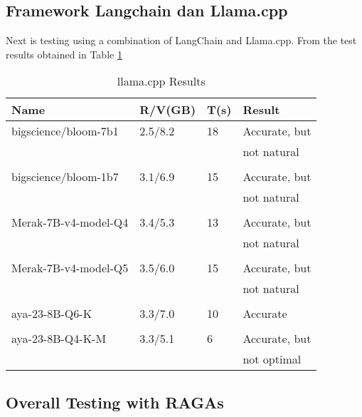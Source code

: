 \subsection{Framework Langchain dan Llama.cpp}
Next is testing using a combination of LangChain and Llama.cpp. From the test results obtained in Table \ref{tab:hasilllama}
\begin{table}[!htbp]
  \caption{llama.cpp Results}
  \label{tab:hasilllama}
  \centering
  \begin{tabular}{llll}
    \toprule
    Name                      & R/V(GB) & T(s)  & Result \\
    \midrule
    bigscience/bloom-7b1      & 2.5/8.2    &18   & Accurate, but \\ \cite{muennighoff2022crosslingual}                          &          &           & not natural \\  
    \\
    bigscience/bloom-1b7
    \cite{muennighoff2022crosslingual}      & 3.1/6.9   &15    & Accurate, but \\
                              &          &           & not natural \\ 
    \\ 
    Merak-7B-v4-model-Q4 \cite{Merak}       & 3.4/5.3    &13   & Accurate, but \\
                              &          &           & not natural \\
    \\
    Merak-7B-v4-model-Q5 \cite{Merak}       & 3.5/6.0   &15    & Accurate, but \\
                              &          &           & not natural \\
    \\
    aya-23-8B-Q6-K \cite{aryabumi2024aya}   & 3.3/7.0  &10     & Accurate \\
    \\
    aya-23-8B-Q4-K-M \cite{aryabumi2024aya} & 3.3/5.1   &6      & Accurate, but \\
                              &          &           & not optimal \\
    \bottomrule
  \end{tabular}
\end{table}

\subsection{Overall Testing with RAGAs}

